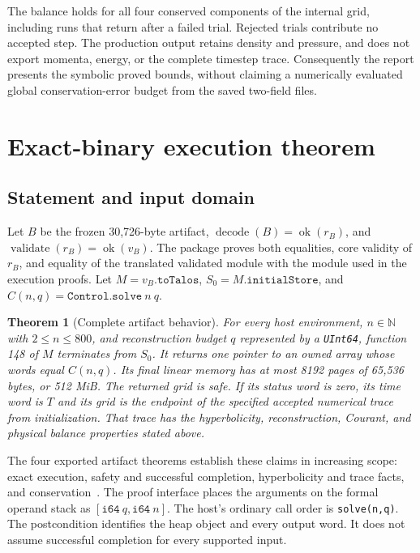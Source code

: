 \documentclass[11pt]{article}
\newcommand{\code}[1]{\texttt{#1}}
\newcommand{\NN}{\mathbb{N}}
\newtheorem{theorem}{Theorem}[section]
\begin{document}
The balance holds for all four conserved components of the internal grid, including runs that return after a failed trial.  Rejected trials contribute no accepted step.  The production output retains density and pressure, and does not export momenta, energy, or the complete timestep trace.  Consequently the report presents the symbolic proved bounds, without claiming a numerically evaluated global conservation-error budget from the saved two-field files.

\section{Exact-binary execution theorem}

\subsection{Statement and input domain}

Let $B$ be the frozen 30,726-byte artifact, $\operatorname{decode}(B)=\operatorname{ok}(r_B)$, and $\operatorname{validate}(r_B)=\operatorname{ok}(v_B)$.  The package proves both equalities, core validity of $r_B$, and equality of the translated validated module with the module used in the execution proofs.  Let $M=v_B.\code{toTalos}$, $S_0=M.\code{initialStore}$, and $C(n,q)=\code{Control.solve}\ n\ q$.

\begin{theorem}[Complete artifact behavior]
\label{thm:artifact}
For every host environment, $n\in\NN$ with $2\leq n\leq800$, and reconstruction budget $q$ represented by a \code{UInt64}, function 148 of $M$ terminates from $S_0$.  It returns one pointer to an owned array whose words equal $C(n,q)$.  Its final linear memory has at most 8192 pages of 65,536 bytes, or 512 MiB.  The returned grid is safe.  If its status word is zero, its time word is $T$ and its grid is the endpoint of the specified accepted numerical trace from initialization.  That trace has the hyperbolicity, reconstruction, Courant, and physical balance properties stated above.
\end{theorem}

The four exported artifact theorems establish these claims in increasing scope: exact execution, safety and successful completion, hyperbolicity and trace facts, and conservation~\cite{spec,artifact}.  The proof interface places the arguments on the formal operand stack as $[\code{i64}\ q,\code{i64}\ n]$.  The host's ordinary call order is \code{solve(n,q)}.  The postcondition identifies the heap object and every output word.  It does not assume successful completion for every supported input.
\end{document}
